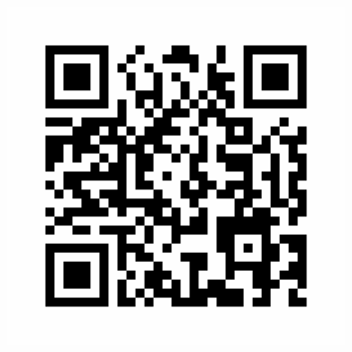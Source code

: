 \documentclass[a0,landscape]{a0poster}
\begin{document}
\begin{minipage}[b]{0.18\linewidth}
\begin{center}
\begin{minipage}{.45\linewidth}
\includegraphics[width=10cm]{hapiest}\
\end{minipage}
\end{center}

\end{minipage}


\end{document}
